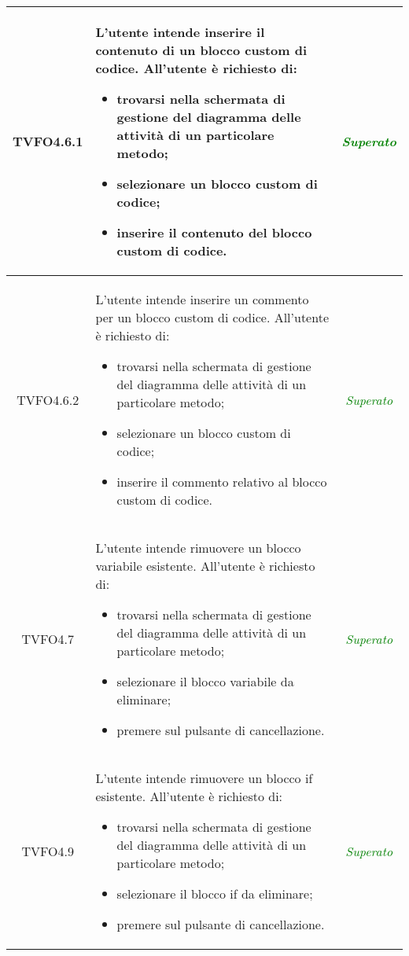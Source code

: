 \begin{longtable}{|c|>{}m{8cm}|c|}
\hypertarget{TVFO4.6.1}{TVFO4.6.1} & L'utente intende inserire il contenuto di un blocco custom di codice.
All'utente è richiesto di:
\begin{itemize}
	\item trovarsi nella schermata di gestione del diagramma delle attività di un particolare metodo;
	\item selezionare un blocco custom di codice;
	\item inserire il contenuto del blocco custom di codice.
\end{itemize} & \textcolor{Green}{\textit{Superato}}\\ \hline

\hypertarget{TVFO4.6.2}{TVFO4.6.2} & L'utente intende inserire un commento per un blocco custom di codice.
All'utente è richiesto di:
\begin{itemize}
	\item trovarsi nella schermata di gestione del diagramma delle attività di un particolare metodo;
	\item selezionare un blocco custom di codice;
	\item inserire il commento relativo al blocco custom di codice.
\end{itemize} & \textcolor{Green}{\textit{Superato}}\\ \hline

\hypertarget{TVFO4.7}{TVFO4.7} & L'utente intende rimuovere un blocco variabile esistente.
All'utente è richiesto di:
\begin{itemize}
	\item trovarsi nella schermata di gestione del diagramma delle attività di un particolare metodo;
	\item selezionare il blocco variabile da eliminare;
	\item premere sul pulsante di cancellazione.
\end{itemize} & \textcolor{Green}{\textit{Superato}}\\ \hline

\hypertarget{TVFO4.9}{TVFO4.9} & L'utente intende rimuovere un blocco if esistente.
All'utente è richiesto di:
\begin{itemize}
	\item trovarsi nella schermata di gestione del diagramma delle attività di un particolare metodo;
	\item selezionare il blocco if da eliminare;
	\item premere sul pulsante di cancellazione.
\end{itemize} & \textcolor{Green}{\textit{Superato}}\\ \hline


\end{longtable}
